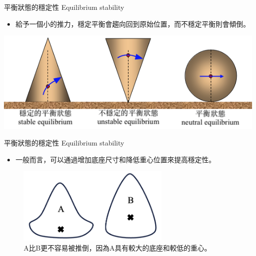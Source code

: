 \documentclass[beamer=true]{standalone}
\begin{document}
\begin{frame}{平衡狀態的穩定性 Equilibrium stability}
    \begin{itemize}
        \item 給予一個小的推力，穩定平衡會趨向回到原始位置，而不穩定平衡則會傾倒。
    \end{itemize}\bigskip
    {\par\centering
        \includegraphics[width=.8\textwidth]{assets/84b8e1a5.png}
        \par}
\end{frame}
\begin{frame}{平衡狀態的穩定性 Equilibrium stability}
    \begin{itemize}
        \item 一般而言，可以通過增加底座尺寸和降低重心位置來提高穩定性。
    \end{itemize}
    \begin{figure}
        \centering
        \includegraphics[width=0.66\textwidth]{assets/5f31a348.png}
        \caption{A比B更不容易被推倒，因為A具有較大的底座和較低的重心。}
        \label{fig:enter-label}
    \end{figure}
\end{frame}
\end{document}
